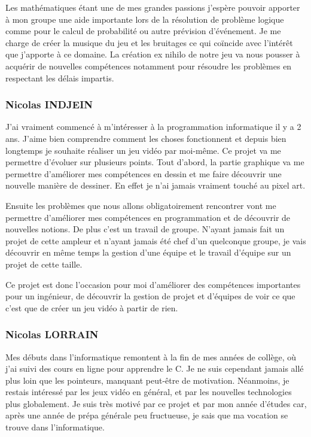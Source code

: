 \documentclass[]{extarticle}
\begin{document}
Les mathématiques étant une de mes grandes passions j’espère pouvoir apporter à mon groupe une aide importante lors de la résolution de problème logique comme pour le calcul de probabilité ou autre prévision d’événement. Je me charge de créer la musique du jeu et les bruitages ce qui coïncide avec l’intérêt  que j’apporte à ce domaine. La création ex nihilo de notre jeu va nous pousser à acquérir de nouvelles compétences notamment pour résoudre les problèmes en respectant les délais impartis.

\bigbreak
	 	\subsubsection{Nicolas INDJEIN}
\bigbreak
\bigbreak
	J'ai vraiment commencé à m'intéresser à la programmation informatique il y a 2 ans. J'aime bien comprendre comment les choses fonctionnent et depuis bien longtemps je souhaite réaliser un jeu vidéo par moi-même. Ce projet va me permettre d’évoluer sur plusieurs points. Tout d’abord, la partie graphique va me permettre d’améliorer mes compétences en dessin et me faire découvrir une nouvelle manière de dessiner. En effet je n’ai jamais vraiment touché au pixel art.
	
Ensuite les problèmes que nous allons obligatoirement rencontrer vont me permettre d’améliorer mes compétences en programmation et de découvrir de nouvelles notions. De plus c’est un travail de groupe. N’ayant jamais fait un projet de cette ampleur et n’ayant jamais été chef d’un quelconque groupe, je vais découvrir en même temps la gestion d’une équipe et le travail d’équipe sur un projet de cette taille.

Ce projet est donc l’occasion pour moi d’améliorer des compétences importantes pour un ingénieur, de découvrir la gestion de projet et d’équipes de voir ce que c’est que de créer un jeu vidéo à partir de rien. 
\bigbreak

		\subsubsection{Nicolas LORRAIN}
\bigbreak
\bigbreak
	Mes débuts dans l'informatique remontent à la fin de mes années de collège, où j'ai suivi des cours en ligne pour apprendre le C. Je ne suis cependant jamais allé plus loin que les pointeurs, manquant peut-être de motivation. Néanmoins, je restais intéressé par les jeux vidéo en général, et par les nouvelles technologies plus globalement. Je suis très motivé par ce projet et par mon année d'études car, après une année de prépa générale peu fructueuse, je sais que ma vocation se trouve dans l'informatique.
	
\end{document}
